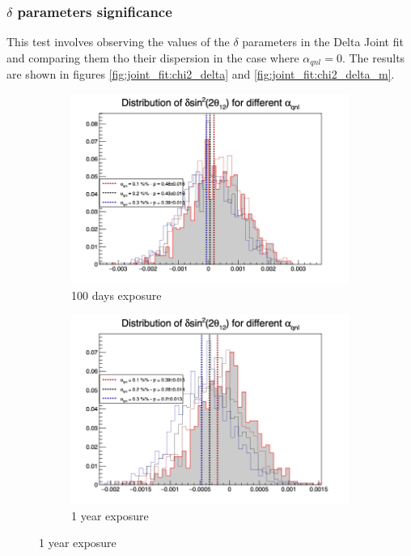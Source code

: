 \documentclass[../main.tex]{subfiles}
\begin{document}
\subsubsection{$\delta$ parameters significance}

This test involves observing the values of the $\delta$ parameters in the Delta Joint fit and comparing them tho their dispersion in the case where $\alpha_{qnl} = 0$. The results are shown in figures \ref{fig:joint_fit:chi2_delta} and \ref{fig:joint_fit:chi2_delta_m}.

\begin{figure}[th]
  \centering
  \begin{subfigure}[t]{0.48\linewidth}
    \includegraphics[width=\linewidth]{images/joint_fit/stat_tests/chi2_delta_100d.png}
    \caption{100 days exposure}
  \end{subfigure}
  \begin{subfigure}[t]{0.48\linewidth}
    \includegraphics[width=\linewidth]{images/joint_fit/stat_tests/chi2_delta_1y.png}
    \caption{1 year exposure}
  \end{subfigure}



\end{figure}
\end{document}
